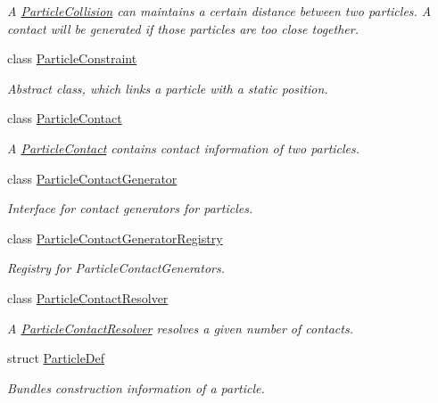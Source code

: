 \begin{DoxyCompactItemize}
\begin{DoxyCompactList}\small\item\em A \mbox{\hyperlink{classr3_1_1_particle_collision}{Particle\+Collision}} can maintains a certain distance between two particles. A contact will be generated if those particles are too close together. \end{DoxyCompactList}\item 
class \mbox{\hyperlink{classr3_1_1_particle_constraint}{Particle\+Constraint}}
\begin{DoxyCompactList}\small\item\em Abstract class, which links a particle with a static position. \end{DoxyCompactList}\item 
class \mbox{\hyperlink{classr3_1_1_particle_contact}{Particle\+Contact}}
\begin{DoxyCompactList}\small\item\em A \mbox{\hyperlink{classr3_1_1_particle_contact}{Particle\+Contact}} contains contact information of two particles. \end{DoxyCompactList}\item 
class \mbox{\hyperlink{classr3_1_1_particle_contact_generator}{Particle\+Contact\+Generator}}
\begin{DoxyCompactList}\small\item\em Interface for contact generators for particles. \end{DoxyCompactList}\item 
class \mbox{\hyperlink{classr3_1_1_particle_contact_generator_registry}{Particle\+Contact\+Generator\+Registry}}
\begin{DoxyCompactList}\small\item\em Registry for Particle\+Contact\+Generators. \end{DoxyCompactList}\item 
class \mbox{\hyperlink{classr3_1_1_particle_contact_resolver}{Particle\+Contact\+Resolver}}
\begin{DoxyCompactList}\small\item\em A \mbox{\hyperlink{classr3_1_1_particle_contact_resolver}{Particle\+Contact\+Resolver}} resolves a given number of contacts. \end{DoxyCompactList}\item 
struct \mbox{\hyperlink{structr3_1_1_particle_def}{Particle\+Def}}
\begin{DoxyCompactList}\small\item\em Bundles construction information of a particle. \end{DoxyCompactList}\item 

\end{DoxyCompactItemize}
